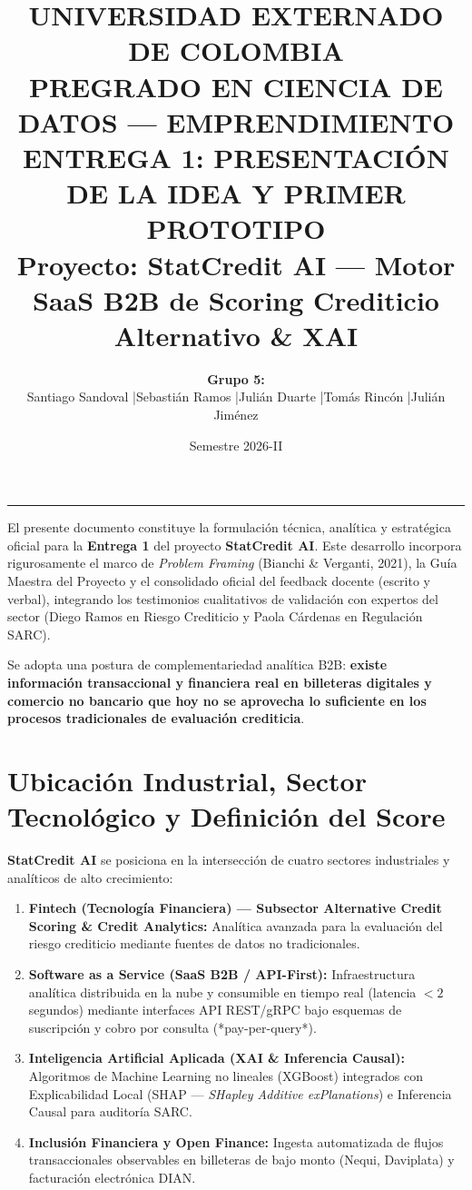 \documentclass[11pt,a4paper]{article}
\title{
    \vspace{-1cm}
    \textbf{\Large UNIVERSIDAD EXTERNADO DE COLOMBIA}\\
    \textbf{\large PREGRADO EN CIENCIA DE DATOS --- EMPRENDIMIENTO}\\
    \vspace{0.5cm}
    \Large \textbf{ENTREGA 1: PRESENTACIÓN DE LA IDEA Y PRIMER PROTOTIPO}\\
    \large \textbf{Proyecto: StatCredit AI --- Motor SaaS B2B de Scoring Crediticio Alternativo \& XAI}
}
\author{\textbf{Grupo 5:}\\ Santiago Sandoval \quad|\quad Sebastián Ramos \quad|\quad Julián Duarte \quad|\quad Tomás Rincón \quad|\quad Julián Jiménez}
\date{Semestre 2026-II}
\begin{document}
\maketitle

\hrule
\vspace{0.5cm}

\begin{tcolorbox}[title=Resumen Ejecutivo y Alineación con la Guía Maestra y Feedback Docente]
El presente documento constituye la formulación técnica, analítica y estratégica oficial para la \textbf{Entrega 1} del proyecto \textbf{StatCredit AI}. Este desarrollo incorpora rigurosamente el marco de \textit{Problem Framing} (Bianchi \& Verganti, 2021), la Guía Maestra del Proyecto y el consolidado oficial del feedback docente (escrito y verbal), integrando los testimonios cualitativos de validación con expertos del sector (Diego Ramos en Riesgo Crediticio y Paola Cárdenas en Regulación SARC).

Se adopta una postura de complementariedad analítica B2B: \textbf{existe información transaccional y financiera real en billeteras digitales y comercio no bancario que hoy no se aprovecha lo suficiente en los procesos tradicionales de evaluación crediticia}.
\end{tcolorbox}

\vspace{0.3cm}

\section{Ubicación Industrial, Sector Tecnológico y Definición del Score}

\textbf{StatCredit AI} se posiciona en la intersección de cuatro sectores industriales y analíticos de alto crecimiento:

\begin{enumerate}[leftmargin=*]
    \item \textbf{Fintech (Tecnología Financiera) --- Subsector Alternative Credit Scoring \& Credit Analytics:} Analítica avanzada para la evaluación del riesgo crediticio mediante fuentes de datos no tradicionales.
    \item \textbf{Software as a Service (SaaS B2B / API-First):} Infraestructura analítica distribuida en la nube y consumible en tiempo real (latencia $<2$ segundos) mediante interfaces API REST/gRPC bajo esquemas de suscripción y cobro por consulta (*pay-per-query*).
    \item \textbf{Inteligencia Artificial Aplicada (XAI \& Inferencia Causal):} Algoritmos de Machine Learning no lineales (XGBoost) integrados con Explicabilidad Local (SHAP --- \textit{SHapley Additive exPlanations}) e Inferencia Causal para auditoría SARC.
    \item \textbf{Inclusión Financiera y Open Finance:} Ingesta automatizada de flujos transaccionales observables en billeteras de bajo monto (Nequi, Daviplata) y facturación electrónica DIAN.
\end{enumerate}
\end{document}
